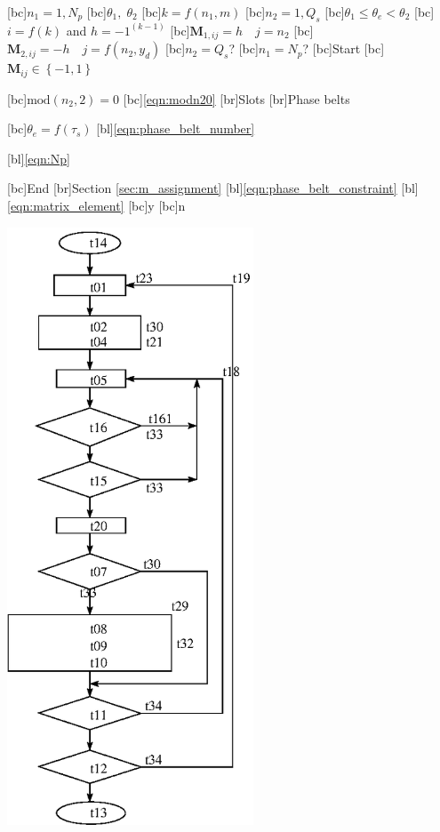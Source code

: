 \begin{psfrags}%
\psfragscanon

[bc]{$n_1 = 1,N_p$}
[bc]{$\theta_1, \; \theta_2$}
[bc]{$k=f(n_1,m)$}
[bc]{$n_2 = 1,Q_s$}
[bc]{$\theta_1 \leq \theta_e < \theta_2$}
[bc]{$i=f(k)$ and $h=-1^{(k-1)}$}
[bc]{$\mathbf{M}_{1,ij}=h \quad j=n_2$}
[bc]{$\mathbf{M}_{2,ij}=-h \quad j=f(n_2,y_d)$}
[bc]{$n_2=Q_s$?}
[bc]{$n_1=N_p$?}
[bc]{Start}
[bc]{$\mathbf{M}_{ij} \in \left\{-1,1\right\}$}

[bc]{$\mbox{mod}(n_2,2)=0$}
[bc]{\eqref{eqn:modn20}}
[br]{Slots}
[br]{Phase belts}

[bc]{$\theta_e = f(\tau_s)$}
[bl]{\eqref{eqn:phase_belt_number}}

[bl]{\eqref{eqn:Np}}

[bc]{End}
[br]{Section \ref{sec:m_assignment}}
[bl]{\eqref{eqn:phase_belt_constraint}}
[bl]{\eqref{eqn:matrix_element}}
[bc]{y}
[bc]{n}

\includegraphics[width=0.55\textwidth]{figs/f_flowchart.eps}
\end{psfrags}%